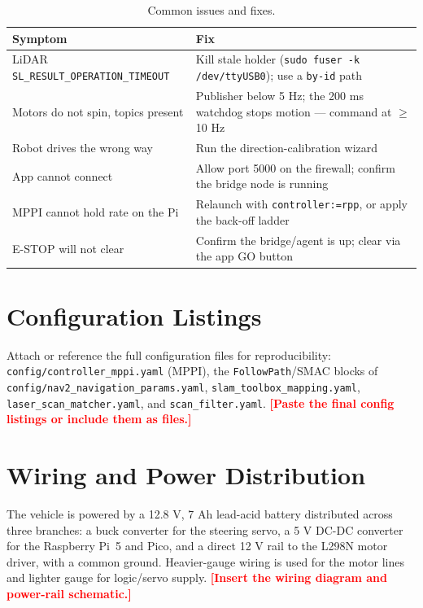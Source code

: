 \documentclass[12pt,a4paper]{report}
\newcommand{\TODO}[1]{\textcolor{red}{\textbf{[#1]}}}
\begin{document}
\begin{appendices}
\begin{table}[H]
\centering
\caption{Common issues and fixes.}
\label{tab:troubleshoot}
\begin{tabularx}{\textwidth}{|p{4.6cm}|X|}
\hline
\textbf{Symptom} & \textbf{Fix} \\
\hline
LiDAR \texttt{SL\_RESULT\_OPERATION\_TIMEOUT} & Kill stale holder (\texttt{sudo fuser -k /dev/ttyUSB0}); use a \texttt{by-id} path \\
\hline
Motors do not spin, topics present & Publisher below 5 Hz; the 200 ms watchdog stops motion --- command at $\geq$10 Hz \\
\hline
Robot drives the wrong way & Run the direction-calibration wizard \\
\hline
App cannot connect & Allow port 5000 on the firewall; confirm the bridge node is running \\
\hline
MPPI cannot hold rate on the Pi & Relaunch with \texttt{controller:=rpp}, or apply the back-off ladder \\
\hline
E-STOP will not clear & Confirm the bridge/agent is up; clear via the app GO button \\
\hline
\end{tabularx}
\end{table}

\chapter{Configuration Listings}
\label{app:config}

Attach or reference the full configuration files for reproducibility:
\texttt{config/controller\_mppi.yaml} (MPPI), the \texttt{FollowPath}/SMAC blocks
of \texttt{config/nav2\_navigation\_params.yaml}, \texttt{slam\_toolbox\_mapping.yaml},
\texttt{laser\_scan\_matcher.yaml}, and \texttt{scan\_filter.yaml}. \TODO{Paste
the final config listings or include them as files.}

\chapter{Wiring and Power Distribution}
\label{app:wiring}

The vehicle is powered by a 12.8 V, 7 Ah lead-acid battery distributed across
three branches: a buck converter for the steering servo, a 5 V DC-DC converter
for the Raspberry Pi~5 and Pico, and a direct 12 V rail to the L298N motor
driver, with a common ground. Heavier-gauge wiring is used for the motor lines
and lighter gauge for logic/servo supply. \TODO{Insert the wiring diagram and
power-rail schematic.}


\end{appendices}
\end{document}

